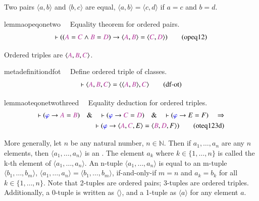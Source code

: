 \pn Two pairs $\langle a,b\rangle$ and $\langle b,c\rangle$ are equal,
$\langle a,b\rangle=\langle c,d\rangle$ if $a=c$ and $b=d$.
\begin{restatable}{lemma}{opeqonetwo}~~ Equality theorem for ordered pairs. 
\begin{align}
\vdash ( ( \mc{A} = \mc{C} \wedge \mc{B} = \mc{D} ) \rightarrow \langle \mc{A}
    , \mc{B} \rangle = \langle \mc{C} , \mc{D} \rangle
    )\label{eq:opeq12}\tag{opeq12}
\end{align}
\end{restatable}

\pn Ordered triples are $\langle \mc{A} , \mc{B} , \mc{C} \rangle $.
\begin{restatable}{metadefinition}{dfot}~~ Define ordered triple of classes. 
\begin{align}
\vdash \langle \mc{A} , \mc{B} , \mc{C} \rangle = \langle \langle \mc{A} ,
    \mc{B} \rangle , \mc{C} \rangle\label{eq:df-ot}\tag{df-ot}
\end{align}
\end{restatable}

\begin{restatable}{lemma}{oteqonetwothreed}~~ Equality deduction for ordered triples. 
\begin{align}
\vdash ( \mw{\varphi} \rightarrow \mc{A} = \mc{B} )\quad\&\quad \vdash (
    \mw{\varphi} \rightarrow \mc{C} = \mc{D} )\quad\&\quad \vdash (
    \mw{\varphi} \rightarrow E = F )\quad\Rightarrow \notag \\
    \quad \vdash ( \mw{\varphi}
    \rightarrow \langle \mc{A} , \mc{C} , E \rangle = \langle \mc{B} , \mc{D} ,
    F \rangle )\label{eq:oteq123d}\tag{oteq123d}
\end{align}
\end{restatable}

\pn More generally, let $n$ be any natural number, $n\in\mathbb{N}$.  Then if $a_1,\ldots,a_n$ are any $n$ elements, then $\langle a_1,\ldots,a_n\rangle$ is an .   The element $a_k$ where $k\in\{1,\ldots,n\}$ is called the k-th element of $\langle a_1,\ldots,a_n\rangle$.
An n-tuple $\langle a_1,\ldots,a_n\rangle$ is equal to an m-tuple 
$\langle b_1,\ldots,b_m\rangle$, $\langle a_1,\ldots,a_n\rangle=\langle b_1,\ldots,b_m\rangle$, if-and-only-if $m=n$ and $a_k=b_k$ for all $k\in\{1,\ldots,n\}$.  
Note that 2-tuples are ordered pairs; 3-tuples are ordered triples.  Additionally, a 0-tuple is written as $\langle \rangle$, and a 1-tuple as $\langle a\rangle$ for any element $a$.  

